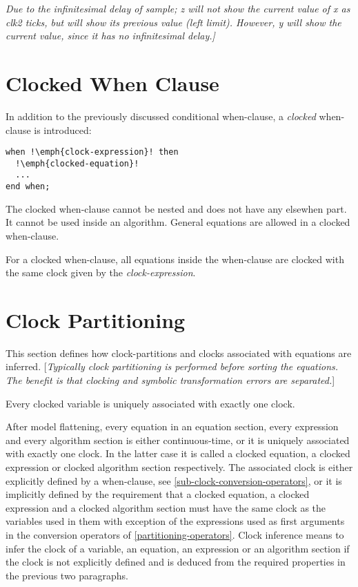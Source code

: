 \emph{Due to the infinitesimal delay of sample; z will not show the
current value of x as clk2 ticks, but will show its previous value (left
limit). However, y will show the current value, since it has no
infinitesimal delay.{]}}

\section{Clocked When Clause}

In addition to the previously discussed conditional when-clause, a
\emph{clocked} when-clause is introduced:
\begin{lstlisting}[language=modelica,escapechar=!]
when !\emph{clock-expression}! then
  !\emph{clocked-equation}!
  ...
end when;
\end{lstlisting}

The clocked when-clause cannot be nested and does not have any elsewhen
part. It cannot be used inside an algorithm. General equations are
allowed in a clocked when-clause.

For a clocked when-clause, all equations inside the when-clause are
clocked with the same clock given by the \emph{clock-expression}.

\section{Clock Partitioning}

This section defines how clock-partitions and clocks associated with
equations are inferred. {[}\emph{Typically clock partitioning is
performed before sorting the equations. The benefit is that clocking and
symbolic transformation errors are separated.}{]}

Every clocked variable is uniquely associated with exactly one clock.

After model flattening, every equation in an equation section, every
expression and every algorithm section is either continuous-time, or it
is uniquely associated with exactly one clock. In the latter case it is
called a clocked equation, a clocked expression or clocked algorithm
section respectively. The associated clock is either explicitly defined
by a when-clause, see \autoref{sub-clock-conversion-operators}, or it is implicitly defined by the
requirement that a clocked equation, a clocked expression and a clocked
algorithm section must have the same clock as the variables used in them
with exception of the expressions used as first arguments in the
conversion operators of \autoref{partitioning-operators}. Clock inference means to infer the
clock of a variable, an equation, an expression or an algorithm section
if the clock is not explicitly defined and is deduced from the required
properties in the previous two paragraphs.

